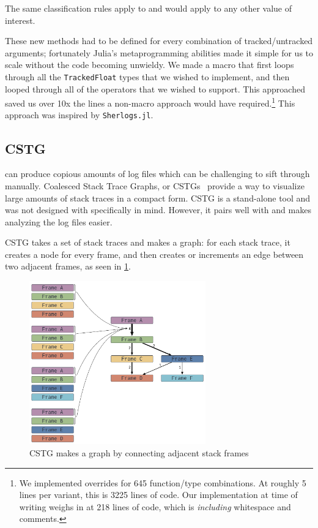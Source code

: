 \documentclass{juliacon}
\begin{document}
The same classification rules apply to \Inf{} and would apply to any other value of interest.

These new methods had to be defined for every combination of tracked/untracked arguments;
fortunately Julia's metaprogramming abilities made it simple for us to scale without the code becoming unwieldy.
We made a macro that first loops through all the \texttt{TrackedFloat} types that we wished to implement, and then looped through all of the operators that we wished to support.
This approached saved us over 10x the lines a non-macro approach would have required.\footnote{We implemented overrides for 645 function/type combinations. At roughly 5 lines per variant, this is 3225 lines of code. Our implementation at time of writing weighs in at 218 lines of code, which is \emph{including} whitespace and comments.}
This approach was inspired by \texttt{Sherlogs.jl}.\cite{kMilanklSherlogsJl2021}

\subsection{CSTG}
\label{s:cstg}

\FT{} can produce copious amounts of log files which can be challenging to sift through manually.
Coalesced Stack Trace Graphs, or CSTGs~\cite{humphreySystematicDebuggingMethods2014} provide a way to visualize large amounts of stack traces in a compact form.
CSTG is a stand-alone tool and was not designed with \FT{} specifically in mind.
However, it pairs well with \FT{} and makes analyzing the log files easier.

CSTG takes a set of stack traces and makes a graph: for each stack trace, it creates a node for every frame, and then creates or increments an edge between two adjacent frames, as seen in \cref{fig:cstg_demo}.

\begin{figure}[t]
  \centering
  \includegraphics[width=3in]{./fig/cstg_static_diagram.png}
  \caption{CSTG makes a graph by connecting adjacent stack frames}
  \label{fig:cstg_demo}
\end{figure}
\end{document}
